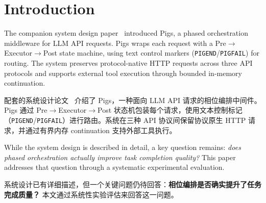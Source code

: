 \section{Introduction}
\label{sec:intro}

The companion system design paper~\citep{pigs_system_design} introduced Pigs, a phased orchestration middleware for LLM API requests. Pigs wraps each request with a Pre$\rightarrow$Executor$\rightarrow$Post state machine, using text control markers (\texttt{PIGEND}/\texttt{PIGFAIL}) for routing. The system preserves protocol-native HTTP requests across three API protocols and supports external tool execution through bounded in-memory continuation.
\begin{chinese}
配套的系统设计论文~\citep{pigs_system_design} 介绍了 Pigs，一种面向 LLM API 请求的相位编排中间件。Pigs 通过 Pre$\rightarrow$Executor$\rightarrow$Post 状态机包装每个请求，使用文本控制标记（\texttt{PIGEND}/\texttt{PIGFAIL}）进行路由。系统在三种 API 协议间保留协议原生 HTTP 请求，并通过有界内存 continuation 支持外部工具执行。
\end{chinese}

While the system design is described in detail, a key question remains: \emph{does phased orchestration actually improve task completion quality?} This paper addresses that question through a systematic experimental evaluation.
\begin{chinese}
系统设计已有详细描述，但一个关键问题仍待回答：\textbf{相位编排是否确实提升了任务完成质量？} 本文通过系统性实验评估来回答这一问题。
\end{chinese}

